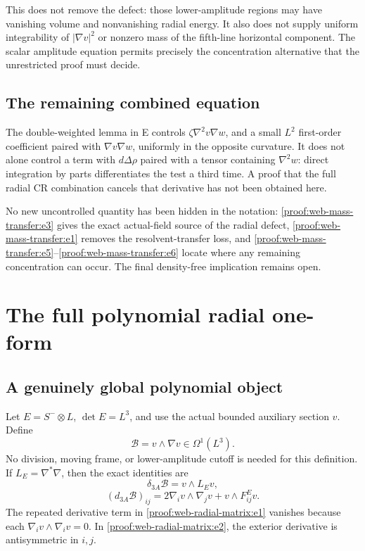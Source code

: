 This does not remove the defect: those lower-amplitude regions may have vanishing volume and nonvanishing radial energy. It also does not supply uniform integrability of \(|\nabla v|^2\) or nonzero mass of the fifth-line horizontal component. The scalar amplitude equation permits precisely the concentration alternative that the unrestricted proof must decide.

\hypertarget{proof:web-mass-transfer:s4}{%
\subsection{The remaining combined equation}\label{proof:web-mass-transfer:s4}}

The double-weighted lemma in E controls \(\zeta\nabla^2v\nabla w\), and a small \(L^2\) first-order coefficient paired with \(\nabla v\nabla w\), uniformly in the opposite curvature. It does not alone control a term with \(d\Delta\rho\) paired with a tensor containing \(\nabla^2w\): direct integration by parts differentiates the test a third time. A proof that the full radial CR combination cancels that derivative has not been obtained here.

No new uncontrolled quantity has been hidden in the notation: \eqref{proof:web-mass-transfer:e3} gives the exact actual-field source of the radial defect, \eqref{proof:web-mass-transfer:e1} removes the resolvent-transfer loss, and \eqref{proof:web-mass-transfer:e5}–\eqref{proof:web-mass-transfer:e6} locate where any remaining concentration can occur. The final density-free implication remains open.


\section{The full polynomial radial one-form}
\label{sec:web-radial-matrix}
\hypertarget{proof:web-radial-matrix:s1}{%
\subsection{A genuinely global polynomial object}\label{proof:web-radial-matrix:s1}}

Let \(E=S^-\otimes L\), \(\det E=L^3\), and use the actual bounded auxiliary section \(v\). Define \[
 \mathcal B=v\wedge\nabla v\in\Omega^1(L^3).
\] No division, moving frame, or lower-amplitude cutoff is needed for this definition. If \(L_E=\nabla^*\nabla\), then the exact identities are \[
 \delta_{3A}\mathcal B=v\wedge L_Ev,
 \tag{\thesection.1}\label{proof:web-radial-matrix:e1}
\] \[
 (d_{3A}\mathcal B)_{ij}
 =2\nabla_i v\wedge\nabla_jv+v\wedge F^E_{ij}v.
 \tag{\thesection.2}\label{proof:web-radial-matrix:e2}
\] The repeated derivative term in \eqref{proof:web-radial-matrix:e1} vanishes because each \(\nabla_i v\wedge\nabla_i v=0\). In \eqref{proof:web-radial-matrix:e2}, the exterior derivative is antisymmetric in \(i,j\).

